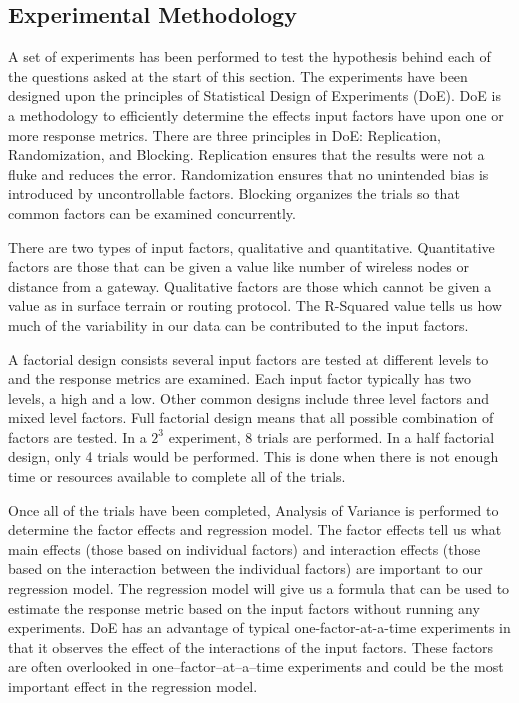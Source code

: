 \documentclass[times, 10pt,onecolumn]{article}
\begin{document}
\subsection{Experimental Methodology}
\label{sec:Method}
A set of experiments has been performed to test the hypothesis behind each of
the questions asked at the start of this section.  The experiments have been
designed upon the principles of Statistical Design of Experiments (DoE).
DoE \cite{Montgomery2005} is a methodology to efficiently determine the effects
input factors have upon one or more response metrics.  There are three
principles in DoE: Replication, Randomization, and Blocking.  Replication
ensures that the results were not a fluke and reduces the error.
Randomization ensures that no unintended bias is introduced by uncontrollable
factors.  Blocking organizes the trials so that common factors can be examined
concurrently.

There are two types of input factors, qualitative and quantitative.
Quantitative factors are those that can be given a value like number of
wireless nodes or distance from a gateway.  Qualitative factors are those
which cannot be given a value as in surface terrain or routing protocol.  The
R-Squared value tells us how much of the variability in our data can be
contributed to the input factors.

A factorial design consists several input factors are tested at different
levels to and the response metrics are examined.  Each input factor typically
has two levels, a high and a low.  Other common designs include three level
factors and mixed level factors.  Full factorial design means that all
possible combination of factors are tested.  In a $2^{3}$ experiment, 8 trials
are performed.  In a half factorial design, only 4 trials would be performed.
This is done when there is not enough time or resources available to complete
all of the trials.

Once all of the trials have been completed, Analysis of Variance is performed
to determine the factor effects and regression model.  The factor effects tell
us what main effects (those based on individual factors) and interaction
effects (those based on the interaction between the individual factors) are
important to our regression model.  The regression model will give us a
formula that can be used to estimate the response metric based on the input
factors without running any experiments.  DoE has an advantage of typical
one-factor-at-a-time experiments in that it observes the effect of the
interactions of the input factors.  These factors are often overlooked in
one--factor--at--a--time experiments and could be the most important effect
in the regression model.
\end{document}
